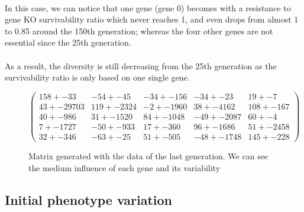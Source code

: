 \documentclass[]{report} %
\begin{document}
    \paragraph*{}
    In this case, we can notice that one gene (gene 0) becomes  with a resistance to gene KO survivability ratio which never reaches 1, and even drops from almost 1 to 0.85 around the 150th generation; whereas the four other genes are not essential since the 25th generation.
    \paragraph*{}
    As a result, the diversity is still decreasing from the 25th generation as the survivability ratio is only based on one single gene.

    \begin{figure}[H] 
            \centering
            \small
    $
          \begin{pmatrix}
                158 +- 33 & -54 +- 45 & -34 +- 156 & -34 +- 23 & 19 +- 7 \\
                43 +- 29703 & 119 +- 2324 & -2 +- 1960 & 38 +- 4162 & 108 +- 167 \\
                40 +- 986 & 31 +- 1520 & 84 +- 1048 & -49 +- 2087 & 60 +- 4 \\
                7 +- 1727 & -50 +- 933 & 17 +- 360 & 96 +- 1686 & 51 +- 2458 \\
                32 +- 346 & -63 +- 25 & 51 +- 505 & -48 +- 1748 & 145 +- 228 
           \end{pmatrix}
    $
            \caption{\footnotesize Matrix generated with the data of the last generation. We can see the medium influence of each gene and its variability}
            \label{mat:ps300xg200xmr1-10-4xprt300}
    \end{figure}
    
    
    
    
\subsection{Initial phenotype variation}
\end{document}
